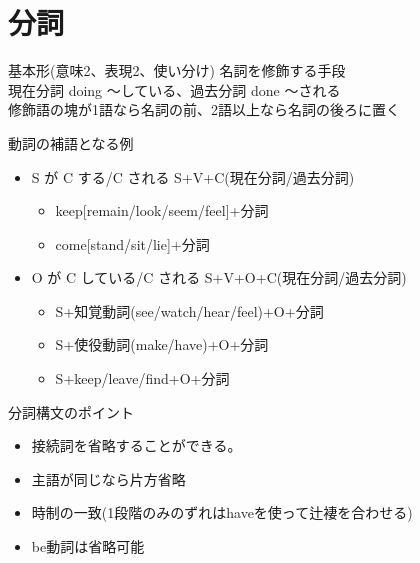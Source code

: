 \documentclass[10pt]{jsarticle}
\newcommand{\answer}[2]{{\color{orange}#2}}
\newcommand{\answer}[2]{\vspace{#1mm}}
\begin{document}
\newpage

\section{分詞}

\begin{itembox}[l]{基本形(意味2、表現2、使い分け)}
	\answer{20}{
		名詞を修飾する手段\\
		現在分詞 doing 〜している、過去分詞 done 〜される\\
		修飾語の塊が1語なら名詞の前、2語以上なら名詞の後ろに置く
	}
\end{itembox}

\begin{itembox}[l]{動詞の補語となる例}
	\answer{20}{
		\begin{itemize}
			\item S が C する/C される S+V+C(現在分詞/過去分詞)
			      \begin{itemize}
				      \item keep[remain/look/seem/feel]+分詞
				      \item come[stand/sit/lie]+分詞
			      \end{itemize}

			\item O が C している/C される S+V+O+C(現在分詞/過去分詞)
			      \begin{itemize}
				      \item S+知覚動詞(see/watch/hear/feel)+O+分詞
				      \item S+使役動詞(make/have)+O+分詞
				      \item S+{keep/leave/find}+O+分詞
			      \end{itemize}

		\end{itemize}
	}
\end{itembox}

\begin{itembox}[l]{分詞構文のポイント}
	\answer{20}{

		\begin{itemize}
			\item 接続詞を省略することができる。
			\item 主語が同じなら片方省略
			\item 時制の一致(1段階のみのずれはhaveを使って辻褄を合わせる)
			\item be動詞は省略可能
		\end{itemize}
	}
\end{itembox}
\end{document}
